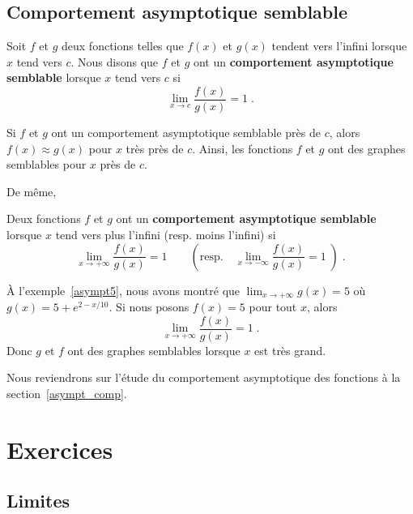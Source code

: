{\subsection{Comportement asymptotique semblable \life}

\begin{focus}{\dfn}
Soit $f$ et $g$ deux fonctions telles que $f(x)$ et $g(x)$ tendent
vers l'infini lorsque $x$ tend vers $c$.  Nous disons que $f$ et $g$ ont un
{\bfseries comportement asymptotique semblable} lorsque $x$ tend vers
$c$ si
\[
\lim_{x\rightarrow c} \frac{f(x)}{g(x)} = 1 \; .
\]
\end{focus}

Si $f$ et $g$ ont un comportement asymptotique semblable près de $c$,
alors $f(x) \approx g(x)$ pour $x$ très près de $c$.  Ainsi, les fonctions
$f$ et $g$ ont des graphes semblables pour $x$ près de $c$.

De même,

\begin{focus}{\dfn} 
Deux fonctions $f$ et $g$ ont un
{\bfseries comportement asymptotique semblable} lorsque $x$ tend vers
plus l'infini (resp. moins l'infini) si
\[
\lim_{x\rightarrow +\infty} \frac{f(x)}{g(x)} = 1 \qquad
(\text{resp.}\quad
\lim_{x\rightarrow -\infty} \frac{f(x)}{g(x)} = 1 \;) \; .
\]
\end{focus}

\begin{egg}
À l'exemple~\ref{asympt5}, nous avons montré que
$\displaystyle \lim_{x\rightarrow +\infty} g(x) = 5$ 
où $\displaystyle g(x)= 5 + e^{2-x/10}$.  Si nous posons $f(x) = 5$ pour
tout $x$, alors
\[
\lim_{x\rightarrow +\infty} \frac{f(x)}{g(x)} = 1 \; .
\]
Donc $g$ et $f$ ont des graphes semblables lorsque $x$ est très grand.
\end{egg}

Nous reviendrons sur l'étude du comportement asymptotique des
fonctions à la section~\ref{asympt_comp}.

}  %

\section{Exercices}

\subsection{Limites}

